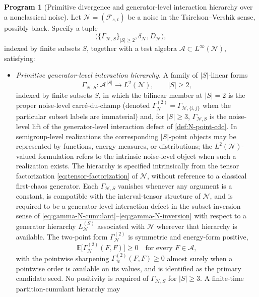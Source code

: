 \documentclass[11pt,reqno]{amsart}
\theoremstyle{plain}
\theoremstyle{definition}
\newtheorem{program}[theorem]{Program}
\theoremstyle{remark}
\newcommand{\E}{\mathbb{E}}
\begin{document}
\begin{program}[\texorpdfstring{Primitive divergence and generator-level interaction hierarchy over a nonclassical noise}{Primitive divergence and generator-level interaction hierarchy over a nonclassical noise}]\label{prog:open}
Let $\mathcal N=(\mathcal F_{s,t})$ be a noise in the
Tsirelson--Vershik sense, possibly black. Specify a tuple
\[
  \bigl(\{\Gamma_{\mathcal N,S}\}_{|S|\ge 2},
        \delta_{\mathcal N},D_{\mathcal N}\bigr),
\]
indexed by finite subsets $S$, together with a test algebra
$\mathcal A\subset L^{\infty}(\mathcal N)$, satisfying:
\begin{itemize}
\item[$(\mathrm i)$] \emph{Primitive generator-level interaction
hierarchy.} A family of $|S|$-linear forms
\[
  \Gamma_{\mathcal N,S}\colon\mathcal A^{\,|S|}\longrightarrow L^{2}(\mathcal N),
  \qquad |S|\ge 2,
\]
indexed by finite subsets $S$, in which the bilinear member at
$|S|=2$ is the proper noise-level carr\'e-du-champ (denoted
$\Gamma_{\mathcal N}^{(2)}=\Gamma_{\mathcal N,\{i,j\}}$ when the
particular subset labels are immaterial) and, for $|S|\ge 3$,
$\Gamma_{\mathcal N,S}$ is the noise-level lift of the
generator-level interaction defect of \cref{def:N-point-cdc}. In
semigroup-level realizations the corresponding $|S|$-point objects
may be represented by functions, energy measures, or distributions;
the $L^{2}(\mathcal N)$-valued formulation refers to the intrinsic
noise-level object when such a realization exists.
The hierarchy is specified intrinsically from the tensor
factorization \eqref{eq:tensor-factorization} of $\mathcal N$,
without reference to a classical first-chaos generator. Each
$\Gamma_{\mathcal N,S}$ vanishes whenever any argument is a constant,
is compatible with the interval-tensor structure of $\mathcal N$,
and is required to be a generator-level interaction defect in the
subset-inversion sense of
\eqref{eq:gamma-N-cumulant}--\eqref{eq:gamma-N-inversion} with
respect to a generator hierarchy $L_{\mathcal N}^{(S)}$ associated
with $\mathcal N$ wherever that hierarchy is available. The
two-point form $\Gamma_{\mathcal N}^{(2)}$ is symmetric and
energy-form positive,
\[
  \E\!\bigl[\Gamma_{\mathcal N}^{(2)}(F,F)\bigr]\ge 0
  \quad\text{for every }F\in\mathcal A,
\]
with the pointwise sharpening
$\Gamma_{\mathcal N}^{(2)}(F,F)\ge 0$ almost surely when a pointwise
order is available on its values, and is identified as the primary
candidate seed. No positivity is required of $\Gamma_{\mathcal N,S}$
for $|S|\ge 3$. A finite-time partition-cumulant hierarchy may

\end{itemize}
\end{program}
\end{document}

